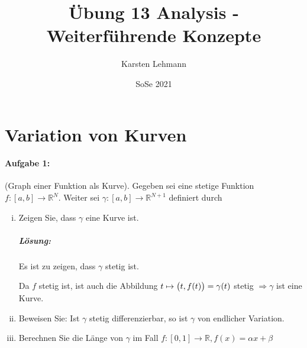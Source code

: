 \documentclass{scrreprt}
\author{Karsten Lehmann}
\date{SoSe 2021}
\title{Übung 13 Analysis - Weiterführende Konzepte}
\begin{document}
\setcounter{chapter}{1}
\section*{Variation von Kurven}
\paragraph{Aufgabe 1:} (Graph einer Funktion als Kurve).
Gegeben sei eine stetige Funktion $f \colon [a, b] \to \mathbb{R}^N$.
Weiter sei $\gamma \colon [a, b] \to \mathbb{R}^{N + 1}$ definiert durch
\begin{enumerate}[(i)]
\item Zeigen Sie, dass $\gamma$ eine Kurve ist.
  \subparagraph{Lösung:} Es ist zu zeigen, dass $\gamma$ stetig ist.

  Da $f$ stetig ist, ist auch die Abbildung
  $t \mapsto \qty\big(t, f(t)) = \gamma(t)$ stetig
  $\Rightarrow \gamma$ ist eine Kurve.

\item Beweisen Sie: Ist $\gamma$ stetig differenzierbar, so ist
  $\gamma$ von endlicher Variation.
\item Berechnen Sie die Länge von $\gamma$ im Fall
  $f \colon [0, 1] \to \mathbb{R}, f(x) = \alpha x + \beta$
\end{enumerate}
\end{document}
